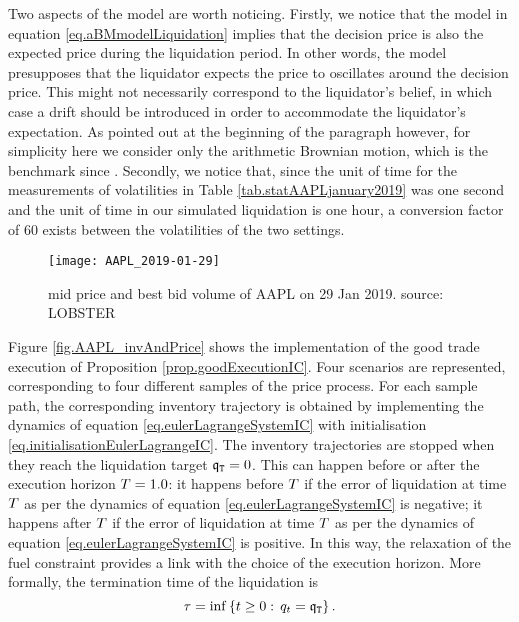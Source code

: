 \documentclass[10pt,a4paper]{article}
\begin{document}
Two aspects of the model are worth noticing. Firstly, we notice that the model in equation \eqref{eq.aBMmodelLiquidation} implies that the decision price is also the expected price during the liquidation period. In other words, the model presupposes that the liquidator expects the price to oscillates around the decision price. This might not necessarily correspond to the liquidator's belief, in which case a drift should be introduced in order to accommodate the liquidator's expectation. As pointed out at the beginning of the  paragraph however, for simplicity here we consider only the arithmetic Brownian motion, which is the benchmark since \cite{AC00opt}.
Secondly, we notice that, since the unit of time for the  measurements of volatilities in Table \ref{tab.statAAPLjanuary2019} was one second and the unit of time in our simulated liquidation is one hour, a conversion factor of 60 exists between the volatilities of the two settings.  	

\begin{center}
\begin{figure}
	\centering
	\texttt{[image: AAPL\_2019-01-29]}
	\caption{{mid price and best bid volume of AAPL on 29 Jan 2019. source: LOBSTER}}
	\label{fig.AAPL_20190129}
\end{figure}

\end{center}


Figure \ref{fig.AAPL_invAndPrice} shows the implementation of the good trade execution of Proposition \ref{prop.goodExecutionIC}. Four scenarios are represented, corresponding to four different samples of the price process. For each sample path, the corresponding inventory trajectory is obtained by implementing the dynamics of equation \eqref{eq.eulerLagrangeSystemIC} with initialisation \eqref{eq.initialisationEulerLagrangeIC}. The inventory trajectories are stopped when they reach the liquidation target $\mathfrak{q}_{\mathtt{T} } = 0$. This can happen before  or after the execution horizon  $T = 1.0$: it happens before $T$ if the error of liquidation at time $T$ as per the dynamics of equation \eqref{eq.eulerLagrangeSystemIC} is negative; it happens after  $T$ if the error of liquidation at time $T$ as per the dynamics of equation \eqref{eq.eulerLagrangeSystemIC} is positive. In this way, the relaxation of the fuel  constraint provides a link with the choice of the execution horizon. More formally, the termination time of the liquidation is 
\begin{equation*}
\tau = \inf \left\lbrace t\geq 0 : \, q_t = \mathfrak{q}_{\mathtt{T} } \right\rbrace. 
\end{equation*}
\end{document}
